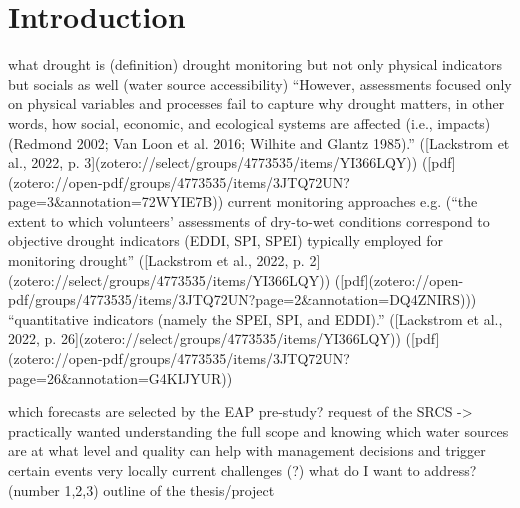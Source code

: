 
\chapter{Introduction} %

\label{Chapter1} %

\newcommand{\keyword}[1]{\textbf{#1}}
\newcommand{\tabhead}[1]{\textbf{#1}}
\newcommand{\code}[1]{\texttt{#1}}
\newcommand{\file}[1]{\texttt{\bfseries#1}}
\newcommand{\option}[1]{\texttt{\itshape#1}}


what drought is (definition)
drought monitoring but not only physical indicators but socials as well (water source accessibility) “However, assessments focused only on physical variables and processes fail to capture why drought matters, in other words, how social, economic, and ecological systems are affected (i.e., impacts) (Redmond 2002; Van Loon et al. 2016; Wilhite and Glantz 1985).” ([Lackstrom et al., 2022, p. 3](zotero://select/groups/4773535/items/YI366LQY)) ([pdf](zotero://open-pdf/groups/4773535/items/3JTQ72UN?page=3\&annotation=72WYIE7B))
current monitoring approaches e.g. (“the extent to which volunteers’ assessments of dry-to-wet conditions correspond to objective drought indicators (EDDI, SPI, SPEI) typically employed for monitoring drought” ([Lackstrom et al., 2022, p. 2](zotero://select/groups/4773535/items/YI366LQY)) ([pdf](zotero://open-pdf/groups/4773535/items/3JTQ72UN?page=2\&annotation=DQ4ZNIRS)))
“quantitative indicators (namely the SPEI, SPI, and EDDI).” ([Lackstrom et al., 2022, p. 26](zotero://select/groups/4773535/items/YI366LQY)) ([pdf](zotero://open-pdf/groups/4773535/items/3JTQ72UN?page=26\&annotation=G4KIJYUR))

which forecasts are selected by the EAP pre-study?
request of the SRCS -> practically wanted
understanding the full scope and knowing which water sources are at what level and quality can help with management decisions and trigger certain events very locally
current challenges (?) what do I want to address? (number 1,2,3)
outline of the thesis/project

